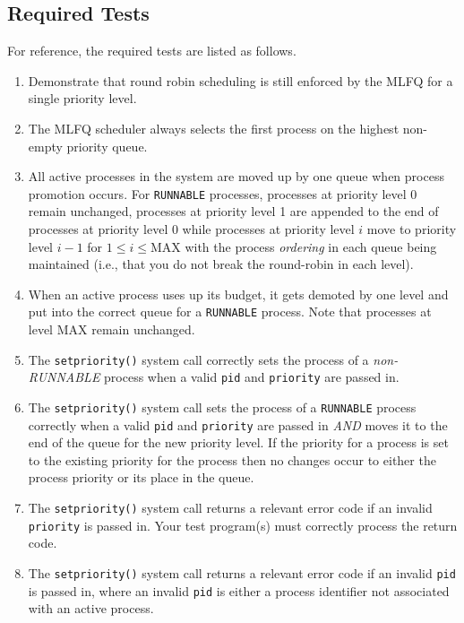 \documentclass[11pt,letterpaper]{report}
\begin{document}
\subsection*{Required Tests}
For reference, the required tests are listed as follows.
	\begin{enumerate}
	\item Demonstrate that round robin scheduling is still enforced by the MLFQ for a single priority level.
	
	\item The MLFQ scheduler always selects the first process on the highest non-empty priority queue.
	
	\item All active processes in the system are moved up by one queue when process promotion occurs. For {\tt RUNNABLE} processes, processes at priority level 0 remain unchanged, processes at priority level 1 are appended to the end of processes at priority level 0 while processes at priority level $i$ move to priority level $i-1$ for $1 \leq i \leq \textrm{MAX}$ with the process \emph{ordering} in each queue being maintained (i.e., that you do not break the round-robin in each level).
	
	\item When an active process uses up its budget, it gets demoted by one level and put into the correct queue for a {\tt RUNNABLE} process. Note that processes at level \textrm{MAX} remain unchanged.
	
	\item The {\tt setpriority()} system call correctly sets the process of a \emph{non-RUNNABLE} process when a valid {\tt pid} and {\tt priority} are passed in.
	
	\item The {\tt setpriority()} system call sets the process of a {\tt RUNNABLE} process correctly when a valid \texttt{pid} and \texttt{priority} are passed in \emph{AND} moves it to the end of the queue for the new priority level. If the priority for a process is set to the existing priority for the process then no changes occur to either the process priority or its place in the queue.
	
	\item The {\tt setpriority()} system call returns a relevant error code if an invalid \texttt{priority} is passed in. Your test program(s) must correctly process the return code.
	
	\item The {\tt setpriority()} system call returns a relevant error code if an invalid
	\texttt{pid} is passed in, where an invalid \texttt{pid} is either a process identifier not associated with an active process.
	

\end{enumerate}
\end{document}
